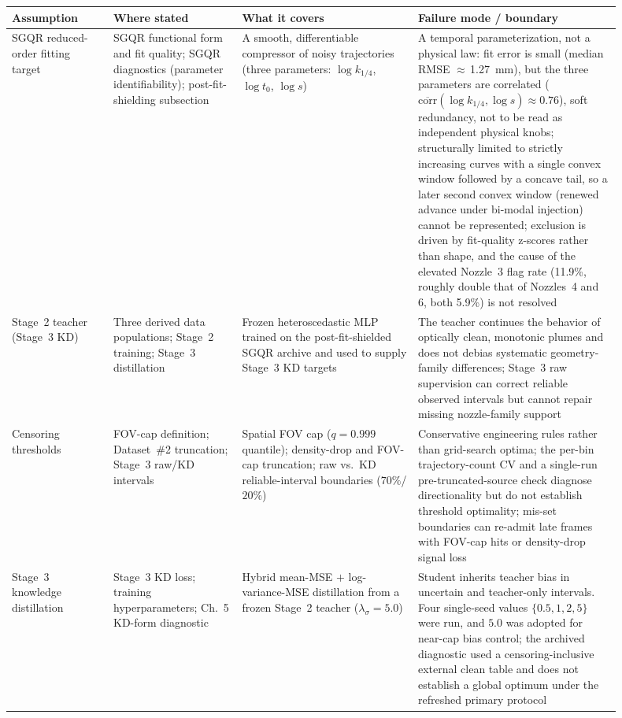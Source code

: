\begin{table}[!ht]
\centering
\scriptsize
\setlength{\tabcolsep}{4pt}
\renewcommand{\arraystretch}{1.15}
\begin{tabular}{@{}L{0.15\linewidth}L{0.19\linewidth}L{0.26\linewidth}L{0.30\linewidth}@{}}
\toprule
Assumption & Where stated & What it covers & Failure mode / boundary \\
\midrule
SGQR reduced-order fitting target & SGQR functional form and fit quality; SGQR diagnostics (parameter identifiability); post-fit-shielding subsection & A smooth, differentiable compressor of noisy trajectories (three parameters: $\log k_{1/4}$, $\log t_0$, $\log s$) & A temporal parameterization, not a physical law: fit error is small (median RMSE $\approx$\,\SI{1.27}{mm}), but the three parameters are correlated ($\overline{\mathrm{corr}}(\log k_{1/4},\log s)\approx0.76$), soft redundancy, not to be read as independent physical knobs; structurally limited to strictly increasing curves with a single convex window followed by a concave tail, so a later second convex window (renewed advance under bi-modal injection) cannot be represented; exclusion is driven by fit-quality z-scores rather than shape, and the cause of the elevated Nozzle~3 flag rate (11.9\%, roughly double that of Nozzles~4 and 6, both 5.9\%) is not resolved \\
\addlinespace
Stage~2 teacher (Stage~3 KD) & Three derived data populations; Stage~2 training; Stage~3 distillation & Frozen heteroscedastic MLP trained on the post-fit-shielded SGQR archive and used to supply Stage~3 KD targets & The teacher continues the behavior of optically clean, monotonic plumes and does not debias systematic geometry-family differences; Stage~3 raw supervision can correct reliable observed intervals but cannot repair missing nozzle-family support \\
\addlinespace
Censoring thresholds & FOV-cap definition; Dataset~\#2 truncation; Stage~3 raw/KD intervals & Spatial FOV cap ($q=0.999$ quantile); density-drop and FOV-cap truncation; raw vs.\ KD reliable-interval boundaries ($70\%$/$20\%$) & Conservative engineering rules rather than grid-search optima; the per-bin trajectory-count CV and a single-run pre-truncated-source check diagnose directionality but do not establish threshold optimality; mis-set boundaries can re-admit late frames with FOV-cap hits or density-drop signal loss \\
\addlinespace
Stage~3 knowledge distillation & Stage~3 KD loss; training hyperparameters; Ch.~5 KD-form diagnostic & Hybrid mean-MSE $+$ log-variance-MSE distillation from a frozen Stage~2 teacher ($\lambda_\sigma=5.0$) & Student inherits teacher bias in uncertain and teacher-only intervals. Four single-seed values $\{0.5,1,2,5\}$ were run, and $5.0$ was adopted for near-cap bias control; the archived diagnostic used a censoring-inclusive external clean table and does not establish a global optimum under the refreshed primary protocol \\

\end{tabular}
\end{table}
